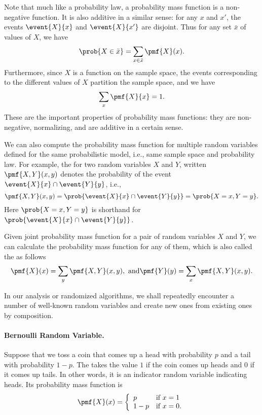 {Note that much like a probability law, a probability mass function is
a non-negative function.
%
It is also additive in a similar sense: for any $x$ and $x'$, the
events $\event{X}{x}$ and $\event{X}{x'}$ are disjoint.
%
Thus for any set $\bar{x}$ of values of $X$, we have 
\[
\prob{X \in \bar{x}} = \sum_{x \in \bar{x}}{\pmf{X}(x)}.
\]
%
Furthermore, since $X$ is a function on the sample space, the events
corresponding to the different values of $X$ partition the sample
space, and we have
\[
\sum_{x}{\pmf{X}{x}} = 1.
\]
%
These are the important properties of probability mass functions: they
are non-negative, normalizing, and are additive in a certain sense. 


We can also compute the probability mass function for multiple random
variables defined for the same probabilistic model, i.e., same sample
space and probability law.
%
For example, the  for two random
variables $X$ and $Y$, written $\pmf{X,Y}(x,y)$ denotes the
probability of the event $\event{X}{x} \cap \event{Y}{y}$, i.e.,
\[
\pmf{X,Y}(x,y) = \prob{\event{X}{x} \cap \event{Y}{y}} = \prob{X = x, Y = y}.
\]
%
Here
 $\prob{X = x, Y = y}$ is shorthand for   $\prob{\event{X}{x} \cap \event{Y}{y}}$.

Given joint probability mass function for a pair of random variables
$X$ and $Y$, we can calculate the probability mass function for any of
them, which is also called the  as follows
\[
\pmf{X}(x) = \sum_{y}{\pmf{X,Y}(x,y)},~\mbox{and}
\\
\pmf{Y}(y) = \sum_{x}{\pmf{X,Y}(x,y)}.
\]

In our analysis or randomized algorithms, we shall repeatedly
encounter a number of well-known random variables and create new ones
from existing ones by composition.

\paragraph{Bernoulli Random Variable.}
Suppose that we toss a  coin that comes up a head with probability $p$
and a tail with probability $1-p$.
%
The  takes the value $1$ if the coin
comes up heads and $0$ if it comes up tails.
%
In other words, it is an indicator random variable indicating heads.
%
Its probability mass function is 
\[
\pmf{X}(x) = 
\left\{
\begin{array}{ll}
p & \mbox{if}~x = 1
\\
1-p & \mbox{if}~x = 0.
\end{array}
\right.
\]

}
